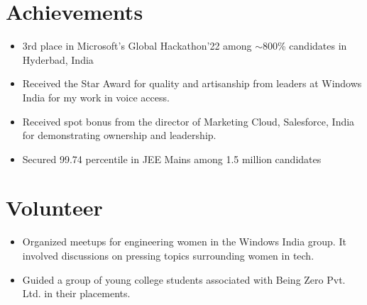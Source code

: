 \documentclass[letterpaper,11pt]{article}
\newcommand{\listItem}[1]{
  \item\small{{#1 \vspace{-2pt}}
  }
}
\newcommand{\resumeSubHeadingListStart}{\begin{itemize}[leftmargin=*]}
\newcommand{\resumeSubHeadingListEnd}{\end{itemize}}
\newcommand{\resumeListItem}[1]{\listItem{#1}\vspace{-4pt}}
\begin{document}
\section{Achievements}
 \resumeSubHeadingListStart
   \resumeListItem
      {3rd place in Microsoft's Global Hackathon'22 among  $\sim$800\% candidates in Hyderbad, India}
   \resumeListItem
      {Received the Star Award for quality and artisanship from leaders at Windows India for my work in voice access.}
    \resumeListItem
      {Received spot bonus from the director of Marketing Cloud, Salesforce, India for demonstrating ownership and leadership.}
    \resumeListItem
      {Secured 99.74 percentile in JEE Mains among 1.5 million candidates}
 \resumeSubHeadingListEnd
 
 
\section{Volunteer}
 \resumeSubHeadingListStart
   \resumeListItem
      {Organized meetups for engineering women in the Windows India group. It involved discussions on pressing topics surrounding women in tech.}
    \resumeListItem
      {Guided a group of young college students associated with Being Zero Pvt. Ltd. in their placements.}
 \resumeSubHeadingListEnd
 
 
\end{document}
